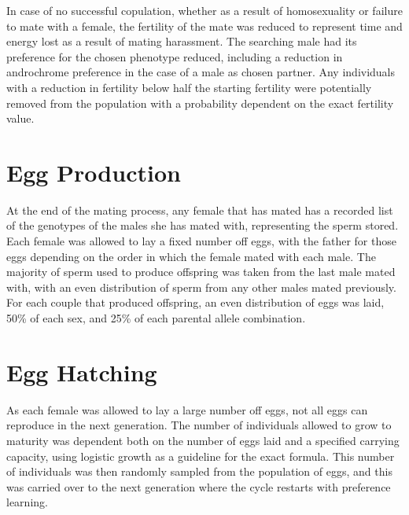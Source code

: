 \documentclass{article}
\begin{document}
In case of no successful copulation, whether as a result of homosexuality or failure to mate with a female, the fertility of the mate was reduced to represent time and energy lost as a result of mating harassment. The searching male had its preference for the chosen phenotype reduced, including a reduction in androchrome preference in the case of a male as chosen partner. Any individuals with a reduction in fertility below half the starting fertility were potentially removed from the population with a probability dependent on the exact fertility value.

\section{Egg Production}
At the end of the mating process, any female that has mated has a recorded list of the genotypes of the males she has mated with, representing the sperm stored. Each female was allowed to lay a fixed number off eggs, with the father for those eggs depending on the order in which the female mated with each male. The majority of sperm used to produce offspring was taken from the last male mated with, with an even distribution of sperm from any other males mated previously. For each couple that produced offspring, an even distribution of eggs was laid, 50\% of each sex, and 25\% of each parental allele combination.

\section{Egg Hatching}
As each female was allowed to lay a large number off eggs, not all eggs can reproduce in the next generation. The number of individuals allowed to grow to maturity was dependent both on the number of eggs laid and a specified carrying capacity, using logistic growth as a guideline for the exact formula. This number of individuals was then randomly sampled from the population of eggs, and this was carried over to the next generation where the cycle restarts with preference learning.

\printbibliography
\end{document}
